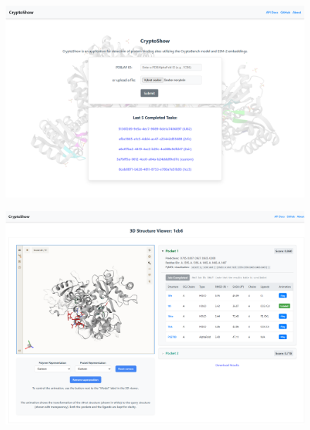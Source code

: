 \documentclass[aspectratio=169]{beamer}
\begin{document}
\begin{frame}
  \begin{figure}
    \centering
    \includegraphics[width=\linewidth,height=\textheight,keepaspectratio]{fig/screen1.png}
  \end{figure}

\end{frame}

\begin{frame}
  \begin{figure}
    \centering
    \includegraphics[width=\linewidth,height=\textheight,keepaspectratio]{fig/screen2.png}
  \end{figure}

\end{frame}
\end{document}
